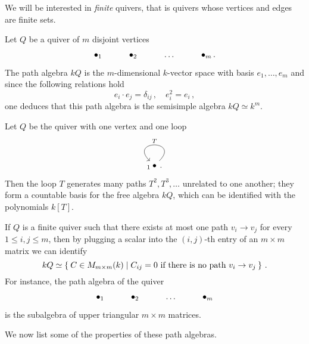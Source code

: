 We will be interested in \emph{finite} quivers, that is 
quivers whose vertices and edges are finite sets.

\begin{ex}
	Let $Q$ be a quiver of $m$ disjoint vertices
	\begin{equation*}
		\begin{tikzcd}
			\bullet_{1} & \bullet_{2} & \dots & \bullet_{m}\,.
		\end{tikzcd}
	\end{equation*}
	The path algebra $kQ$ is the $m$-dimensional $k$-vector space
	with basis $e_{1}, \dots, e_{m}$ and since the following relations hold
	$$e_{i} \cdot e_{j} = \delta_{ij}\,, \quad e_{i}^{2} = e_{i}\,,$$
	one deduces that this path algebra is the semisimple algebra $kQ \simeq k^{m}$.
\end{ex}

\begin{ex}
	Let $Q$ be the quiver with one vertex and one loop
	\begin{equation*}
		\begin{tikzcd}
			{}_{1} \bullet \ar[loop, "T"']\,.
		\end{tikzcd}
	\end{equation*}
	Then the loop $T$ generates many paths $T^{2}, T^{3}, \dots$
	unrelated to one another; they form a countable basis for the free algebra $kQ$,
	which can be identified with the polynomials $k[T]$.
\end{ex}

\begin{ex}
	If $Q$ is a finite quiver such that there exists at most
	one path $v_{i} \to v_{j}$ for every $1 \le i, j \le m$,
	then by plugging a scalar into the $(i,j)$-th entry of an
	$m \times m$ matrix we can identify 
	\begin{equation*}
		kQ \simeq
		\Set{C \in M_{m \times m}(k) | C_{ij}=0 \text{ if there is no path } v_{i} \to v_{j}}\,.
	\end{equation*}
	For instance, the path algebra of the quiver 
	\begin{equation*}
		\begin{tikzcd}
			\bullet_{1} 
			& \bullet_{2} 
			& \dots & \bullet_{m}
		\end{tikzcd}
	\end{equation*}
	is the subalgebra of upper triangular $m \times m$ matrices.
\end{ex}

We now list some of the properties of these path algebras.

